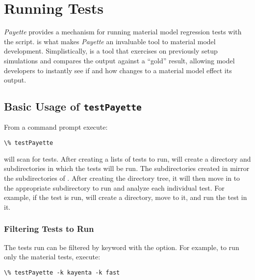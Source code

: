 \documentclass[letterpaper,10pt,english]{sphinxmanual}
\begin{document}
\chapter{Running Tests}
\label{Files/test_payette:running-tests}\label{Files/test_payette::doc}
\emph{Payette} provides a mechanism for running material model regression tests with
the  script.  is what makes \emph{Payette} an
invaluable tool to material model development. Simplistically,
 is a tool that exercises  on previously
setup simulations and compares the output against a ``gold'' result, allowing model
developers to instantly see if and how changes to a material model effect its
output.


\section{Basic Usage of \texttt{testPayette}}
\label{Files/test_payette:basic-usage-of-testpayette}
From a command prompt execute:

\begin{Verbatim}[commandchars=\\\{\}]
\% testPayette
\end{Verbatim}

 will scan  for tests. After
creating a lists of tests to run,  will create a
 directory and subdirectories in which the tests
will be run. The subdirectories created in  mirror
the subdirectories of . After creating the
 directory tree, it will then move in to the
appropriate subdirectory to run and analyze each individual test. For example, if
the  test is run,
 will create a
 directory,
move to it, and run the  test in it.


\subsection{Filtering Tests to Run}
\label{Files/test_payette:filtering-tests-to-run}
The tests run can be filtered by keyword with the  option. For example, to
run only the   material tests, execute:

\begin{Verbatim}[commandchars=\\\{\}]
\% testPayette -k kayenta -k fast
\end{Verbatim}
\end{document}
